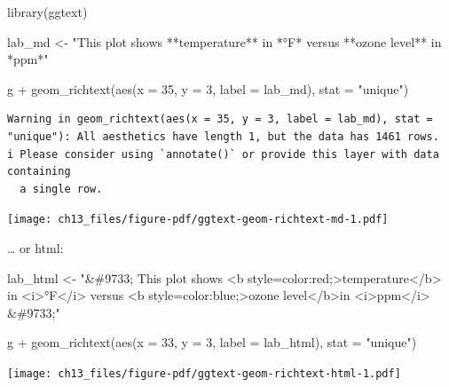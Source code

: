 \documentclass[
  letterpaper,
]{scrbook}
\newenvironment{Shaded}{\begin{snugshade}}{\end{snugshade}}
\newcommand{\AttributeTok}[1]{\textcolor[rgb]{0.40,0.45,0.13}{#1}}
\newcommand{\DecValTok}[1]{\textcolor[rgb]{0.68,0.00,0.00}{#1}}
\newcommand{\FunctionTok}[1]{\textcolor[rgb]{0.28,0.35,0.67}{#1}}
\newcommand{\NormalTok}[1]{\textcolor[rgb]{0.00,0.23,0.31}{#1}}
\newcommand{\OtherTok}[1]{\textcolor[rgb]{0.00,0.23,0.31}{#1}}
\newcommand{\SpecialCharTok}[1]{\textcolor[rgb]{0.37,0.37,0.37}{#1}}
\newcommand{\StringTok}[1]{\textcolor[rgb]{0.13,0.47,0.30}{#1}}
\begin{document}
\begin{Shaded}
\begin{Highlighting}[]
\FunctionTok{library}\NormalTok{(ggtext)}

\NormalTok{lab\_md }\OtherTok{\textless{}{-}} \StringTok{"This plot shows **temperature** in *°F* versus **ozone level** in *ppm*"}

\NormalTok{g }\SpecialCharTok{+}
  \FunctionTok{geom\_richtext}\NormalTok{(}\FunctionTok{aes}\NormalTok{(}\AttributeTok{x =} \DecValTok{35}\NormalTok{, }\AttributeTok{y =} \DecValTok{3}\NormalTok{, }\AttributeTok{label =}\NormalTok{ lab\_md),}
                \AttributeTok{stat =} \StringTok{"unique"}\NormalTok{)}
\end{Highlighting}
\end{Shaded}

\begin{verbatim}
Warning in geom_richtext(aes(x = 35, y = 3, label = lab_md), stat = "unique"): All aesthetics have length 1, but the data has 1461 rows.
i Please consider using `annotate()` or provide this layer with data containing
  a single row.
\end{verbatim}

\texttt{[image: ch13\_files/figure-pdf/ggtext-geom-richtext-md-1.pdf]}

\ldots{} or html:

\begin{Shaded}
\begin{Highlighting}[]
\NormalTok{lab\_html }\OtherTok{\textless{}{-}} \StringTok{"\&\#9733; This plot shows \textless{}b style=\textquotesingle{}color:red;\textquotesingle{}\textgreater{}temperature\textless{}/b\textgreater{} in \textless{}i\textgreater{}°F\textless{}/i\textgreater{} versus \textless{}b style=\textquotesingle{}color:blue;\textquotesingle{}\textgreater{}ozone level\textless{}/b\textgreater{}in \textless{}i\textgreater{}ppm\textless{}/i\textgreater{} \&\#9733;"}

\NormalTok{g }\SpecialCharTok{+}
  \FunctionTok{geom\_richtext}\NormalTok{(}\FunctionTok{aes}\NormalTok{(}\AttributeTok{x =} \DecValTok{33}\NormalTok{, }\AttributeTok{y =} \DecValTok{3}\NormalTok{, }\AttributeTok{label =}\NormalTok{ lab\_html),}
                \AttributeTok{stat =} \StringTok{"unique"}\NormalTok{)}
\end{Highlighting}
\end{Shaded}

\texttt{[image: ch13\_files/figure-pdf/ggtext-geom-richtext-html-1.pdf]}
\end{document}
